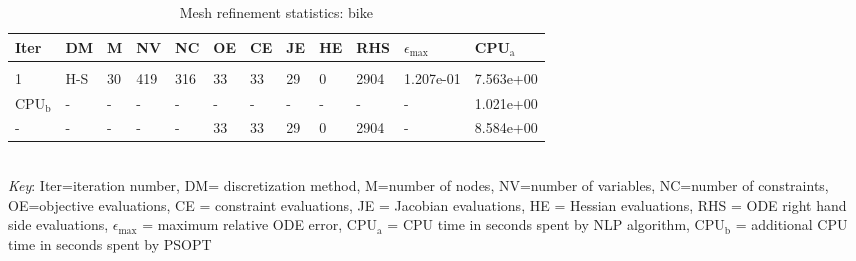 
\begin{table}
\caption{Mesh refinement statistics: bike}
\label{mesh_stats_bike}
\renewcommand{\tabcolsep}{0.15cm}
\small
\begin{tabular}{llllllllllll}
Iter&DM&M&NV&NC&OE&CE&JE&HE&RHS&$\epsilon_{\max}$&CPU$_\mathrm{a}$ \\ \hline \\
1&H-S&30&419&316&33&33&29&0&2904&1.207e-01&7.563e+00\\
\hline
CPU$_\mathrm{b}$ &-&-&-&-&-&-&-&-&-&-&1.021e+00\\
-&-&-&-&-&33&33&29&0&2904&-&8.584e+00\\
\end{tabular}
\newline \\ \emph{Key}: Iter=iteration number, DM= discretization method, M=number of nodes, NV=number of variables, NC=number of constraints, OE=objective evaluations,  	              CE = constraint evaluations, JE = Jacobian evaluations, HE = Hessian evaluations, RHS = ODE right hand side 		      evaluations, $\epsilon_{\max}$ = maximum relative ODE error, CPU$_\mathrm{a}$ = CPU time in seconds spent by NLP algorithm, 		      CPU$_\mathrm{b}$ = additional CPU time in seconds spent by PSOPT
\normalsize
\end{table}